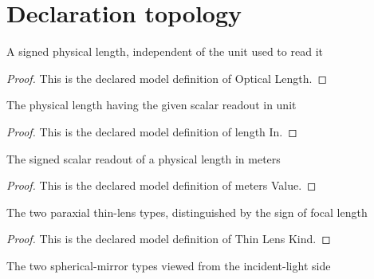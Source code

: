 \section{Declaration topology}
\begin{definition}
  \label{def:physics:phyx-mini-0030:phyxminiproblems-problemphyxmini0030-opticallength}
  A signed physical length, independent of the unit used to read it
\end{definition}
\begin{proof}
  This is the declared model definition of Optical Length.
\end{proof}
\begin{definition}[length In]
  \label{def:physics:phyx-mini-0030:phyxminiproblems-problemphyxmini0030-lengthin}
  The physical length having the given scalar readout in unit
\end{definition}
\begin{proof}
  This is the declared model definition of length In.
\end{proof}
\begin{definition}
  \label{def:physics:phyx-mini-0030:phyxminiproblems-problemphyxmini0030-metersvalue}
  The signed scalar readout of a physical length in meters
\end{definition}
\begin{proof}
  This is the declared model definition of meters Value.
\end{proof}
\begin{definition}
  \label{def:physics:phyx-mini-0030:phyxminiproblems-problemphyxmini0030-thinlenskind}
  The two paraxial thin-lens types, distinguished by the sign of focal length
\end{definition}
\begin{proof}
  This is the declared model definition of Thin Lens Kind.
\end{proof}
\begin{definition}
  \label{def:physics:phyx-mini-0030:phyxminiproblems-problemphyxmini0030-sphericalmirrorkind}
  The two spherical-mirror types viewed from the incident-light side
\end{definition}

